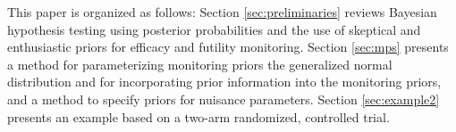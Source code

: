 \documentclass[12pt]{article}
\begin{document}
This paper is organized as follows: %
Section \ref{sec:preliminaries} reviews Bayesian hypothesis testing using posterior probabilities and the use of  skeptical and enthusiastic priors for efficacy and futility monitoring. 
%
Section \ref{sec:mps} presents a method for parameterizing monitoring priors the generalized normal distribution and for incorporating prior information into the monitoring priors, and a method to specify priors for nuisance parameters.
%
Section \ref{sec:example2} presents an example based on a two-arm randomized, controlled trial. 
\end{document}
